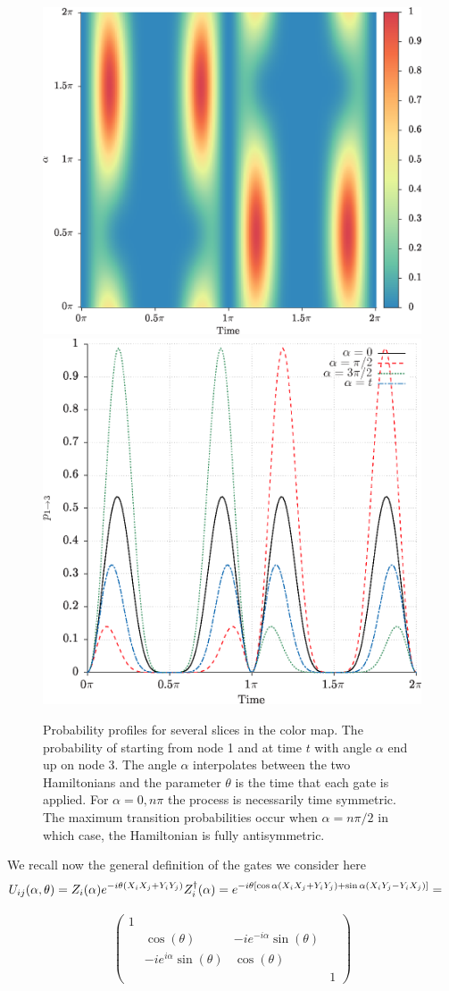 \documentclass[aps,pra,12pt,nofootinbib,superscriptaddress,longbibliography,showpacs]{revtex4-1}
\theoremstyle{plain}
\theoremstyle{definition}
\begin{document}
\begin{figure}[h]
  \centering
  \includegraphics[height=0.4\textwidth]{square}
  \hfill
  \includegraphics[height=0.4\textwidth]{slices}
  \caption{
    \label{fig:prob}
Probability profiles for several slices in the color map. The probability of
starting from node 1 and at time $t$ with angle $\alpha$ end up on node 3. The
angle $\alpha$ interpolates between
the
two Hamiltonians and the parameter $\theta$ is the time that each gate is
applied.  For $\alpha = 0, n\pi$ the process is necessarily time symmetric. 
The maximum transition probabilities occur when $\alpha = n\pi/2$ in which
case, the Hamiltonian is fully antisymmetric.}  
\end{figure}

We recall now the general definition of the gates we consider here 
\begin{align}
\notag
U_{ij}(\alpha, \theta) = 
Z_i(\alpha)e^{-i\theta(X_iX_j+Y_iY_j)}Z_i^\dagger(\alpha) &= e^{-i
\theta[\cos\alpha(X_iX_j+Y_iY_j)+\sin\alpha(X_iY_j-Y_iX_j)] }
= 
\end{align}

\begin{align}
\begin{pmatrix}
1\\
& \cos(\theta) &  -ie^{-i\alpha}\sin(\theta)\\
& -ie^{i\alpha}\sin(\theta) & \cos(\theta)\\
& & & 1
\end{pmatrix}
\end{align} 
\end{document}
